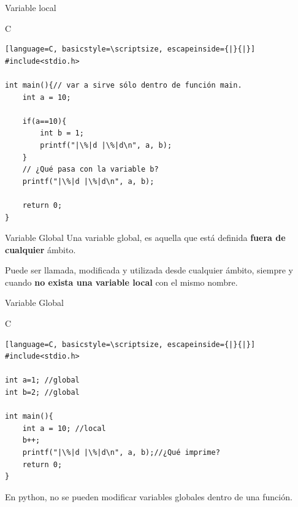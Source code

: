 \documentclass{beamer}
\begin{document}
\begin{frame}[fragile]{Variable local}
\begin{exampleblock}{C}
\begin{lstlisting}[language=C, basicstyle=\scriptsize, escapeinside={|}{|}]
#include<stdio.h>

int main(){// var a sirve sólo dentro de función main. 
	int a = 10;

	if(a==10){
		int b = 1;
		printf("|\%|d |\%|d\n", a, b);
	}
	// ¿Qué pasa con la variable b?
	printf("|\%|d |\%|d\n", a, b); 

	return 0;
}
\end{lstlisting}\end{exampleblock}
\end{frame}


\begin{frame}[fragile]{Variable Global}
Una variable global, es aquella que está definida \textbf{fuera de cualquier} ámbito.\\
\bigskip 

Puede ser llamada, modificada y utilizada desde cualquier ámbito, siempre y cuando \textbf{no exista una variable local} con el mismo nombre. 

\end{frame}

\begin{frame}[fragile]{Variable Global}

\begin{exampleblock}{C}
\begin{lstlisting}[language=C, basicstyle=\scriptsize, escapeinside={|}{|}]
#include<stdio.h>

int a=1; //global
int b=2; //global

int main(){
	int a = 10; //local
	b++;
	printf("|\%|d |\%|d\n", a, b);//¿Qué imprime? 
	return 0;
}
\end{lstlisting}\end{exampleblock}

En python, no se pueden modificar variables globales dentro de una función.
\end{frame}
\end{document}
